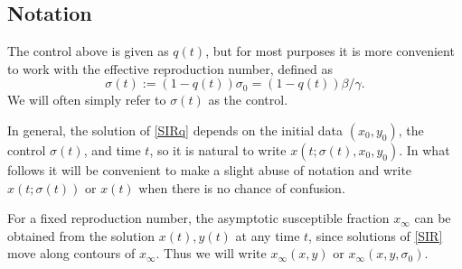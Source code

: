 \documentclass[english,12pt,letter]{article}
\newcommand{\Rnot}{\sigma_0}
\newcommand{\Sinf}{x_\infty}
\begin{document}
\subsection{Notation}
The control above is given as $q(t)$, but for most purposes it is more
convenient to work with the effective reproduction number, defined as
$$
    \sigma(t) := (1-q(t))\Rnot = (1-q(t))\beta/\gamma.
$$
We will often simply refer to $\sigma(t)$ as the control.

In general, the solution of \eqref{SIRq} depends on the initial data
$(x_0,y_0)$, the control $\sigma(t)$, and time $t$, so it is natural to write
$x(t;\sigma(t),x_0,y_0)$.
In what follows it will be convenient to make a slight abuse of notation and
write $x(t;\sigma(t))$ or $x(t)$ when there is no chance of confusion.

For a fixed reproduction number, the asymptotic susceptible fraction $\Sinf$
can be obtained from the solution $x(t), y(t)$ at any time $t$, since solutions
of \eqref{SIR} move along contours of $\Sinf$.  Thus we will write $\Sinf(x,y)$
or $\Sinf(x,y,\Rnot)$.
\end{document}
